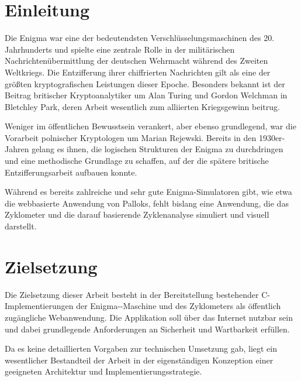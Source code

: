 \documentclass[12pt, ngerman, a4paper, numbers=noenddot]{article}
\begin{document}
\newpage
{}
\renewcommand{\thepage}{\arabic{page}}



	



\newpage

\glsaddall

\section{Einleitung}

Die Enigma war eine der bedeutendsten Verschlüsselungsmaschinen des 20. Jahrhunderts und spielte eine zentrale Rolle in der militärischen Nachrichtenübermittlung der deutschen Wehrmacht während des Zweiten Weltkriegs. Die Entzifferung ihrer chiffrierten Nachrichten gilt als eine der größten kryptografischen Leistungen dieser Epoche. Besonders bekannt ist der Beitrag britischer Kryptoanalytiker um Alan Turing und Gordon Welchman in Bletchley Park, deren Arbeit wesentlich zum alliierten Kriegsgewinn beitrug. 

Weniger im öffentlichen Bewusstsein verankert, aber ebenso grundlegend, war die Vorarbeit polnischer Kryptologen um Marian Rejewski. Bereits in den 1930er-Jahren gelang es ihnen, die logischen Strukturen der Enigma zu durchdringen und eine methodische Grundlage zu schaffen, auf der die spätere britische Entzifferungsarbeit aufbauen konnte.

Während es bereits zahlreiche und sehr gute Enigma-Simulatoren gibt, wie etwa die webbasierte Anwendung von Palloks\autocite{enigma_simulator_palloks}, fehlt bislang eine Anwendung, die das Zyklometer und die darauf basierende Zyklenanalyse simuliert und visuell darstellt.


\newpage
\section{Zielsetzung}
Die Zielsetzung dieser Arbeit besteht in der Bereitstellung bestehender C\hyp{}Im\-ple\-men\-tie\-run\-gen der Enigma-\hyp{}Maschine und des Zyklometers als öffentlich zugängliche Webanwendung. Die Applikation soll über das Internet nutzbar sein und dabei grundlegende Anforderungen an Sicherheit und Wartbarkeit erfüllen.  


Da es keine detaillierten Vorgaben zur technischen Umsetzung gab, liegt ein wesentlicher Bestandteil der Arbeit in der eigenständigen Konzeption einer geeigneten Architektur und Implementierungsstrategie.  
\end{document}
